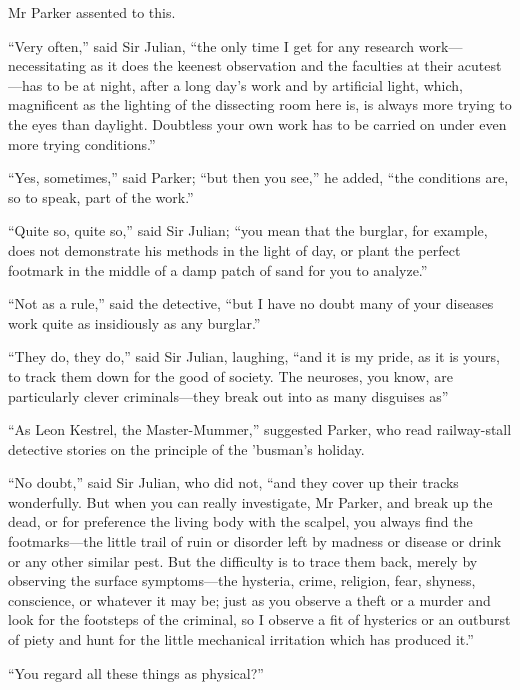 Mr Parker assented to this.

\enquote{Very often,} said Sir Julian, \enquote{the only time I get for any research work\allowbreak---\allowbreak necessitating as it does the keenest observation and the faculties at their acutest\allowbreak---\allowbreak has to be at night, after a long day’s work and by artificial light, which, magnificent as the lighting of the dissecting room here is, is always more trying to the eyes than daylight. Doubtless your own work has to be carried on under even more trying conditions.}

\enquote{Yes, sometimes,} said Parker; \enquote{but then you see,} he added, \enquote{the conditions are, so to speak, part of the work.}

\enquote{Quite so, quite so,} said Sir Julian; \enquote{you mean that the burglar, for example, does not demonstrate his methods in the light of day, or plant the perfect footmark in the middle of a damp patch of sand for you to analyze.}

\enquote{Not as a rule,} said the detective, \enquote{but I have no doubt many of your diseases work quite as insidiously as any burglar.}

\enquote{They do, they do,} said Sir Julian, laughing, \enquote{and it is my pride, as it is yours, to track them down for the good of society. The neuroses, you know, are particularly clever criminals\allowbreak---\allowbreak they break out into as many disguises as\longdash}

\enquote{As Leon Kestrel, the Master-Mummer,} suggested Parker, who read railway-stall detective stories on the principle of the ’busman’s holiday.

\enquote{No doubt,} said Sir Julian, who did not, \enquote{and they cover up their tracks wonderfully. But when you can really investigate, Mr Parker, and break up the dead, or for preference the living body with the scalpel, you always find the footmarks\allowbreak---\allowbreak the little trail of ruin or disorder left by madness or disease or drink or any other similar pest. But the difficulty is to trace them back, merely by observing the surface symptoms\allowbreak---\allowbreak the hysteria, crime, religion, fear, shyness, conscience, or whatever it may be; just as you observe a theft or a murder and look for the footsteps of the criminal, so I observe a fit of hysterics or an outburst of piety and hunt for the little mechanical irritation which has produced it.}

\enquote{You regard all these things as physical?}

